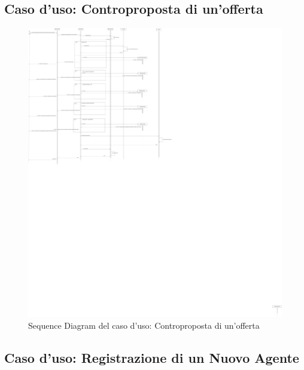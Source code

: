 \subsection{Caso d'uso: Controproposta di un'offerta}

\begin{figure}[H]
	\centering
	\includegraphics[width=\textwidth,height=\textheight,keepaspectratio]{Immagini/Sequence diagram/Sequence Diagram Effettua Controproposta.png}
	\caption[Sequence diagram 3]{Sequence Diagram del caso d'uso: Controproposta di un'offerta}
\end{figure}

\subsection{Caso d'uso: Registrazione di un Nuovo Agente}

